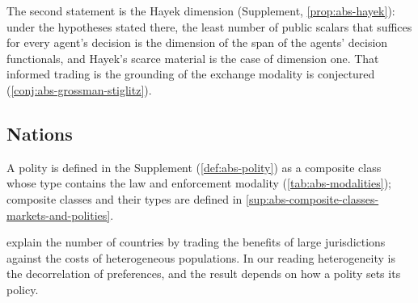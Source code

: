 The second statement is the Hayek dimension (Supplement, \cref{prop:abs-hayek}): under the hypotheses stated there, the least number of public scalars that suffices for every agent's decision is the dimension of the span of the agents' decision functionals, and Hayek's scarce material is the case of dimension one. That informed trading is the grounding of the exchange modality is conjectured (\cref{conj:abs-grossman-stiglitz}).

\subsection{Nations}\label{sec:abs-nations}

A polity is defined in the Supplement (\cref{def:abs-polity}) as a composite class whose type contains the law and enforcement modality (\cref{tab:abs-modalities}); composite classes and their types are defined in \cref{sup:abs-composite-classes-markets-and-polities}.

\citet{alesina1997number} explain the number of countries by trading the benefits of large jurisdictions against the costs of heterogeneous populations. In our reading heterogeneity is the decorrelation of preferences, and the result depends on how a polity sets its policy.

